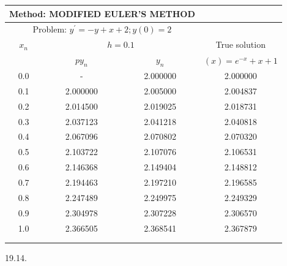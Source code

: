 \documentclass[10pt]{article}
\begin{document}
\begin{center}
\begin{tabular}{|c|c|c|c|}
\hline
\multicolumn{3}{|c|}{Method: MODIFIED EULER'S METHOD} &  \\
\hline
\multicolumn{3}{|c|}{Problem: $y^{\prime}=-y+x+2 ; y(0)=2$} &  \\
\hline
$x_{n}$ & \multicolumn{2}{|c|}{$h=0.1$} & \multicolumn{1}{c|}{True solution} \\
\cline { 2 - 4 }
 & $p y_{n}$ & $y_{n}$ & $(x)=e^{-x}+x+1$ \\
\hline
0.0 & - & 2.000000 & 2.000000 \\
\hline
0.1 & 2.000000 & 2.005000 & 2.004837 \\
\hline
0.2 & 2.014500 & 2.019025 & 2.018731 \\
\hline
0.3 & 2.037123 & 2.041218 & 2.040818 \\
\hline
0.4 & 2.067096 & 2.070802 & 2.070320 \\
\hline
0.5 & 2.103722 & 2.107076 & 2.106531 \\
\hline
0.6 & 2.146368 & 2.149404 & 2.148812 \\
\hline
0.7 & 2.194463 & 2.197210 & 2.196585 \\
\hline
0.8 & 2.247489 & 2.249975 & 2.249329 \\
\hline
0.9 & 2.304978 & 2.307228 & 2.306570 \\
\hline
1.0 & 2.366505 & 2.368541 & 2.367879 \\
\hline
 &  &  &  \\
\hline
 &  &  &  \\
\hline
\end{tabular}
\end{center}

19.14.
\end{document}
